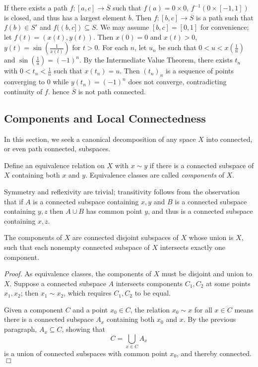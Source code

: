 \begin{itemize}
    If there exists a path $f: [a, c] \rightarrow \overline{S}$ such that $f(a) = 0 \times 0$, $f^{-1}(0 \times [-1, 1])$ is closed, and thus has a largest element $b$. Then $f: [b, c] \rightarrow \overline{S}$ is a path such that $f(b) \in S'$ and $f((b, c]) \subseteq S$. We may assume $[b, c] = [0, 1]$ for convenience; let $f(t) = (x(t), y(t))$. Then $x(0) = 0$ and $x(t) > 0$, $y(t) = \sin \left( \frac{1}{x(t)} \right)$ for $t>0$. For each $n$, let $u_n$ be such that $0 < u < x \left(\frac1n\right)$ and $\sin \left( \frac1u\right) = (-1)^n$. By the Intermediate Value Theorem, there exists $t_n$ with $0 < t_n < \frac1n$ such that $x(t_n) = u$. Then $(t_n)_n$ is a sequence of points converging to $0$ while $y(t_n) = (-1)^n$ does not converge, contradicting continuity of $f$. hence $\overline{S}$ is not path connected.
\end{itemize}

\subsection{Components and Local Connectedness}
In this section, we seek a canonical decomposition of any space $X$ into connected, or even path connected, subspaces.
\begin{definition}\label{3.13}
    Define an equivalence relation on $X$ with $x \sim y$ if there is a connected subspace of $X$ containing both $x$ and $y$. Equivalence classes are called {\it components} of $X$.
\end{definition}
Symmetry and reflexivity are trivial; transitivity follows from the observation that if $A$ is a connected subspace containing $x, y$ and $B$ is a connected subspace containing $y, z$ then $A \cup B$ has common point $y$, and thus is a connected subspace containing $x, z$.

\begin{theorem}\label{3.14}
    The components of $X$ are connected disjoint subspaces of $X$ whose union is $X$, such that each nonempty connected subspace of $X$ intersects exactly one component.
\end{theorem}
{\it Proof.} As equivalence classes, the components of $X$ must be disjoint and union to $X$. Suppose a connected subspace $A$ intersects components $C_1, C_2$ at some points $x_1, x_2$; then $x_1 \sim x_2$, which requires $C_1, C_2$ to be equal.

Given a component $C$ and a point $x_0 \in C$, the relation $x_0 \sim x$ for all $x \in C$ means there is a connected subspace $A_x$ containing both $x_0$ and $x$. By the previous paragraph, $A_x \subseteq C$, showing that
$$C = \bigcup_{x \in C}A_x$$
is a union of connected subspaces with common point $x_0$, and thereby connected. $\Box$

